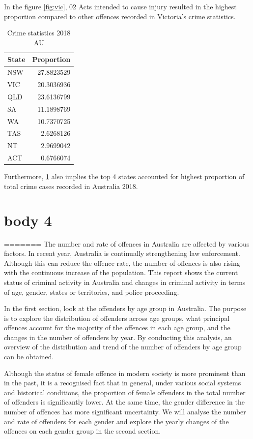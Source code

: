 \documentclass[11pt,a4paper,]{article}
\begin{document}
In the figure \ref{fig:vic}, 02 Acts intended to cause injury resulted in the highest proportion compared to other offences recorded in Victoria's crime statistics.

\begin{table}

\caption{\label{tab:table}Crime statistics 2018 AU}
\centering
\begin{tabular}[t]{l|r}
\hline
State & Proportion\\
\hline
NSW & 27.8823529\\
\hline
VIC & 20.3036936\\
\hline
QLD & 23.6136799\\
\hline
SA & 11.1898769\\
\hline
WA & 10.7370725\\
\hline
TAS & 2.6268126\\
\hline
NT & 2.9699042\\
\hline
ACT & 0.6766074\\
\hline
\end{tabular}
\end{table}

Furthermore, \ref{tab:table} also implies the top 4 states accounted for highest proportion of total crime cases recorded in Australia 2018.

\section*{body 4}
=======
The number and rate of offences in Australia are affected by various factors. In recent year, Australia is continually strengthening law enforcement. Although this can reduce the offence rate, the number of offences is also rising with the continuous increase of the population. This report shows the current status of criminal activity in Australia and changes in criminal activity in terms of age, gender, states or territories, and police proceeding.

In the first section, look at the offenders by age group in Australia. The purpose is to explore the distribution of offenders across age groups, what principal offences account for the majority of the offences in each age group, and the changes in the number of offenders by year. By conducting this analysis, an overview of the distribution and trend of the number of offenders by age group can be obtained.

Although the status of female offence in modern society is more prominent than in the past, it is a recognised fact that in general, under various social systems and historical conditions, the proportion of female offenders in the total number of offenders is significantly lower. At the same time, the gender difference in the number of offences has more significant uncertainty. We will analyse the number and rate of offenders for each gender and explore the yearly changes of the offences on each gender group in the second section.
\end{document}
